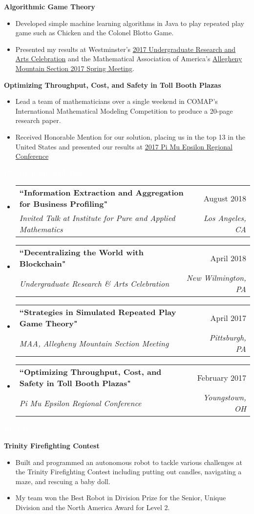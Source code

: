 \documentclass[letterpaper,11pt]{article}
\makeatletter
\newcommand{\resitem}[1]{\item #1 \vspace{-2pt}}
\newcommand{\resheading}[1]{{\large \colorbox{mypurple}{\begin{minipage}{\textwidth}{\textbf{#1 \vphantom{p\^{E}}}}\end{minipage}}}}
\newcommand{\ressubheading}[4]{
	\begin{tabular*}{7.0in}{l@{\extracolsep{\fill}}r}
		\textbf{#1} & #2 \\
		\textit{#3} & \textit{#4} \\
	\end{tabular*}\vspace{-6pt}}
\makeatother
\begin{document}
		\textbf{Algorithmic Game Theory}
		\begin{itemize}
			\resitem{Developed simple machine learning algorithms in Java to play repeated play game such as Chicken and the Colonel Blotto Game.}
			\resitem{Presented my results at Westminster's \href{https://alexandermichels.github.io/docs/2017-urac-schedule.pdf}{2017 Undergraduate Research and Arts Celebration} and the Mathematical Association of America's \href{https://alexandermichels.github.io/docs/MAA2017Abstracts.pdf}{Allegheny Mountain Section 2017 Spring Meeting}.}
		\end{itemize}
	
		\textbf{Optimizing Throughput, Cost, and Safety in Toll Booth Plazas}
		\begin{itemize}
			\resitem{Lead a team of mathematicians over a single weekend in COMAP's International Mathematical Modeling Competition to produce a 20-page research paper.}
			\resitem{Received Honorable Mention for our solution, placing us in the top 13 in the United States and presented our results at \href{https://alexandermichels.github.io/docs/PME2017Program.pdf}{2017 Pi Mu Epsilon Regional Conference}}
		\end{itemize}
		
		\resheading{\textcolor{white}{Presentations and Talks}}
		\begin{itemize}
				\item
				\ressubheading{``Information Extraction and Aggregation for Business Profiling"}{August 2018}{Invited Talk at Institute for Pure and Applied Mathematics}{Los Angeles, CA}
				\item
				\ressubheading{``Decentralizing the World with Blockchain"}{April 2018}{Undergraduate Research \& Arts Celebration}{New Wilmington, PA}
				\item
				\ressubheading{``Strategies in Simulated Repeated Play Game Theory"}{April 2017}{MAA, Allegheny Mountain Section Meeting}{Pittsburgh, PA}
				\item
				\ressubheading{``Optimizing Throughput, Cost, and Safety in Toll Booth Plazas"}{February 2017}{Pi Mu Epsilon Regional Conference}{Youngstown, OH}
					
		\end{itemize}
	
	\resheading{\textcolor{white}{Projects}}
	
			\vspace{0.1in}
	
	\textbf{Trinity Firefighting Contest}
	\begin{itemize}
		\resitem{Built and programmed an autonomous robot to tackle various challenges at the Trinity Firefighting Contest including putting out candles, navigating a maze, and rescuing a baby doll.}
		\resitem{My team won the Best Robot in Division Prize for the Senior, Unique Division and the North America Award for Level 2.}
	\end{itemize}
	
\end{document}

